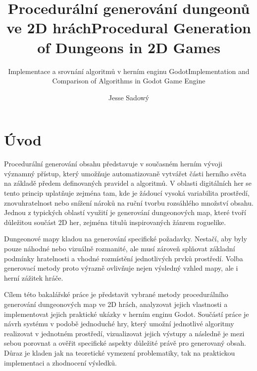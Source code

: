 \documentclass[
  program=itk,
  biblatex,
  figures=false,
  glossaries,
  index
]{kidiplom}
\title{Procedurální generování dungeonů ve 2D hrách}
\title[english]{Procedural Generation of Dungeons in 2D Games}
\subtitle{Implementace a srovnání algoritmů v herním enginu Godot}
\subtitle[english]{Implementation and Comparison of Algorithms in Godot Game Engine}
\author{Jesse Sadowý}
\begin{document}
\maketitle



\newcommand{\BibLaTeX}{\textsc{Bib}\LaTeX}


\section{Úvod}
Procedurální generování obsahu představuje v současném herním vývoji významný přístup, který umožňuje automatizovaně vytvářet části herního světa na základě předem definovaných pravidel a algoritmů. V oblasti digitálních her se tento princip uplatňuje zejména tam, kde je žádoucí vysoká variabilita prostředí, znovuhratelnost nebo snížení nároků na ruční tvorbu rozsáhlého množství obsahu. Jednou z typických oblastí využití je generování dungeonových map, které tvoří důležitou součást 2D her, zejména titulů inspirovaných žánrem roguelike.

Dungeonové mapy kladou na generování specifické požadavky. Nestačí, aby byly pouze náhodné nebo vizuálně rozmanité, ale musí zároveň splňovat základní podmínky hratelnosti a vhodné rozmístění jednotlivých prvků prostředí. Volba generovací metody proto výrazně ovlivňuje nejen výsledný vzhled mapy, ale i herní zážitek hráče.

Cílem této bakalářské práce je představit vybrané metody procedurálního generování dungeonových map ve 2D hrách, analyzovat jejich vlastnosti a implementovat jejich praktické ukázky v herním enginu Godot. Součástí práce je návrh systému v podobě jednoduché hry, který umožní jednotlivé algoritmy realizovat v jednotném prostředí, vizualizovat jejich výstupy a následně je mezi sebou porovnat a ověřit specifické aspekty důležité právě pro generovaný obsah. Důraz je kladen jak na teoretické vymezení problematiky, tak na praktickou implementaci a zhodnocení výsledků.
\end{document}
